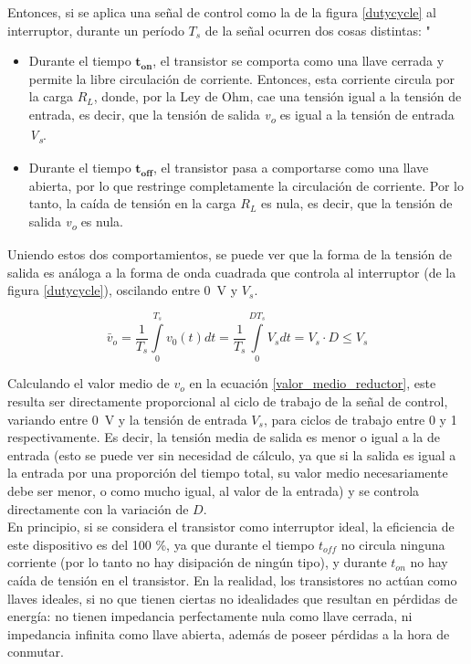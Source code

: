 Entonces, si se aplica una señal de control como la de la figura \ref{dutycycle} al interruptor, durante un período $T_s$ de la señal ocurren dos cosas distintas:
"
\begin{itemize}
    \item {\SemiBold Durante el tiempo $\mathbf{t_{on}}$}, el transistor se comporta como una llave cerrada y permite la libre circulación de corriente. Entonces, esta corriente circula por la carga $R_L$, donde, por la Ley de Ohm, cae una tensión igual a la tensión de entrada, es decir, que la tensión de salida {\Medium \textit{v\textsubscript{o}} es igual a la tensión de entrada \textit{V\textsubscript{s}}}.
    \item {\SemiBold Durante el tiempo $\mathbf{t_{off}}$}, el transistor pasa a comportarse como una llave abierta, por lo que restringe completamente la circulación de corriente. Por lo tanto, la caída de tensión en la carga $R_L$ es nula, es decir, que la tensión de salida {\Medium \textit{v\textsubscript{o}} es nula}.
\end{itemize}

Uniendo estos dos comportamientos, se puede ver que la forma de la tensión de salida es análoga a la forma de onda cuadrada que controla al interruptor (de la figura \ref{dutycycle}), oscilando entre \SI{0}{\volt} y $V_s$.

\begin{equation}\label{valor_medio_reductor}
    \bar{v}_o = \frac{1}{T_s}\int\limits^{T_s}_0 v_0(t) dt = \frac{1}{T_s}\int\limits^{DT_s}_0 V_s dt = V_s\cdot D \leq V_s
\end{equation}

Calculando el valor medio de $v_o$ en la ecuación \ref{valor_medio_reductor}, este resulta ser directamente proporcional al ciclo de trabajo de la señal de control, variando entre \SI[]{0}[]{\volt} y la tensión de entrada $V_s$, para ciclos de trabajo entre \num{0} y \num{1} respectivamente. Es decir, la {\Medium tensión media de salida es menor o igual a la de entrada} (esto se puede ver sin necesidad de cálculo, ya que si la salida es igual a la entrada por una proporción del tiempo total, su valor medio necesariamente debe ser menor, o como mucho igual, al valor de la entrada) y se controla directamente con la variación de $D$.\\

En principio, si se considera el transistor como interruptor ideal, la eficiencia de este dispositivo es del 100 \%, ya que durante el tiempo $t_{off}$ no circula ninguna corriente (por lo tanto no hay disipación de ningún tipo), y durante $t_{on}$ no hay caída de tensión en el transistor. En la realidad, los transistores no actúan como llaves ideales, si no que tienen ciertas no idealidades que resultan en pérdidas de energía: no tienen impedancia perfectamente nula como llave cerrada, ni impedancia infinita como llave abierta, además de poseer pérdidas a la hora de conmutar.\\


